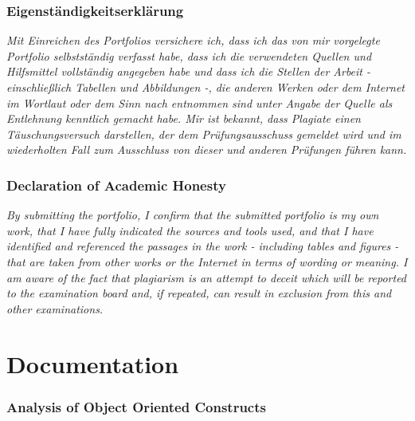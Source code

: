 \documentclass[]{tukportfolio}
\author{Ayush Pandey}
\begin{document}

\maketitle

\section*{Eigenständigkeitserklärung}
\textit{Mit Einreichen des Portfolios versichere ich, dass ich das von mir vorgelegte Portfolio selbstständig verfasst habe, dass ich die verwendeten Quellen und Hilfsmittel vollständig angegeben habe und dass ich die Stellen der Arbeit - einschließlich Tabellen und Abbildungen -, die anderen Werken oder dem Internet im Wortlaut oder dem Sinn nach entnommen sind unter Angabe der Quelle als Entlehnung kenntlich gemacht habe.
Mir ist bekannt, dass Plagiate einen Täuschungsversuch darstellen, der dem Prüfungsausschuss gemeldet wird und im wiederholten Fall zum Ausschluss von dieser und anderen Prüfungen führen kann.} \\

\section*{Declaration of Academic Honesty}
\textit{By submitting the portfolio, I confirm that the submitted portfolio is my own work, that I have fully indicated the sources and tools used, and that I have identified and referenced the passages in the work - including tables and figures - that are taken from other works or the Internet in terms of wording or meaning.
I am aware of the fact that plagiarism is an attempt to deceit which will be reported to the examination board and, if repeated, can result in exclusion from this and other examinations.}

\newpage

\part*{Documentation}


\section{Analysis of Object Oriented Constructs}
\end{document}
